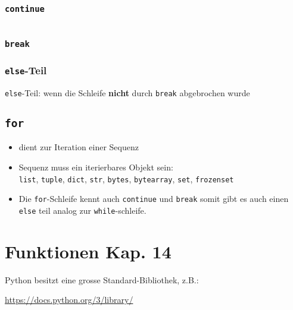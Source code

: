 \begin{minipage}[t]{0.49\textwidth}
\subsubsection{\texttt{continue}}

\end{minipage}
\begin{minipage}[t]{0.02\textwidth} $ \quad $\end{minipage}
\begin{minipage}[t]{0.49\textwidth}
\subsubsection{\texttt{break}}

\end{minipage}

\subsubsection{\texttt{else}-Teil}

\texttt{else}-Teil: wenn die Schleife \textbf{nicht} durch \texttt{break} abgebrochen wurde

\subsection{\texttt{for}}

\begin{itemize}
	\item dient zur Iteration einer Sequenz
	\item Sequenz muss ein iterierbares Objekt sein:\\
	\texttt{list}, \texttt{tuple}, \texttt{dict}, \texttt{str}, \texttt{bytes}, \texttt{bytearray}, \texttt{set}, \texttt{frozenset}
	\item Die \texttt{for}-Schleife kennt auch \texttt{continue} und \texttt{break} somit gibt es auch einen \texttt{else} teil analog zur \texttt{while}-schleife.
\end{itemize}



\section[Funktionen]{Funktionen \tiny{Kap. 14}}
Python besitzt eine grosse Standard-Bibliothek, z.B.:

\url{https://docs.python.org/3/library/}\\

